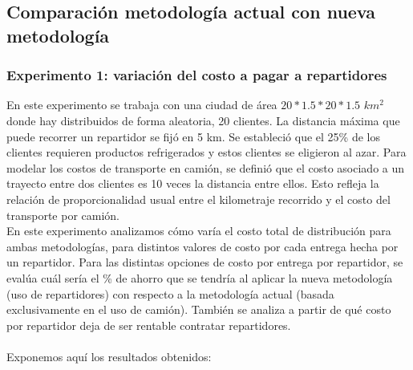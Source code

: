 \documentclass{article}
\begin{document}
\subsection{Comparación metodología actual con nueva metodología} 

\subsubsection{Experimento 1: variación del costo a pagar a repartidores}

En este experimento se trabaja con una ciudad de área $20 * 1.5 * 20 * 1.5$  $km^{2}$ donde hay distribuidos de forma aleatoria, 20 clientes. La distancia máxima que puede recorrer un repartidor se fijó en 5 km. 
Se estableció que el 25\% de los clientes requieren productos refrigerados y estos clientes se eligieron al azar. 
Para modelar los costos de transporte en camión, se definió que el costo asociado a un trayecto entre dos clientes es 10 veces la distancia entre ellos. Esto refleja la relación de proporcionalidad usual entre el kilometraje recorrido y el costo del transporte por camión. \\
En este experimento analizamos cómo varía el costo total de distribución para ambas metodologías, para distintos valores de costo por cada entrega hecha por un repartidor. Para las distintas opciones de costo por entrega por repartidor, se evalúa cuál sería el \% de ahorro que se tendría al aplicar la nueva metodología (uso de repartidores) con respecto a la metodología actual (basada exclusivamente en el uso de camión). También se analiza a partir de qué costo por repartidor deja de ser rentable contratar repartidores. \\
\\
Exponemos aquí los resultados obtenidos: 

\begin{table}[H]
\centering
{}
\caption{Comparación de costos entre metodologías para distintos costos por repartidor}
\end{table}
\end{document}
